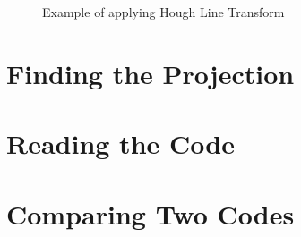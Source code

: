 \begin{figure}[H]
     \centering
     \hfill
     \hfill
     \caption{Example of applying Hough Line Transform}
     \label{fig:hough-line-transform}
\end{figure}


\section{Finding the Projection}

\section{Reading the Code}

\section{Comparing Two Codes}